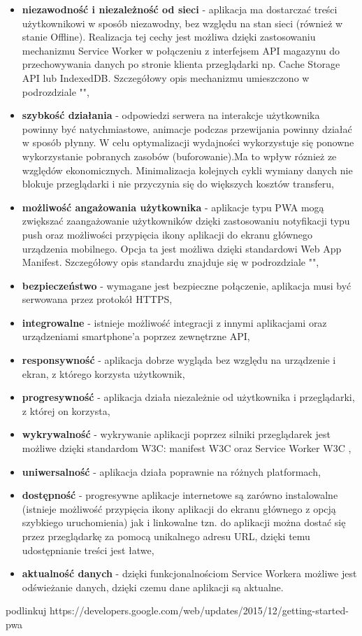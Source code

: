 \documentclass[a4paper,12pt,twoside,openany]{report}
\begin{document}
\begin{itemize}
\item{\textbf{niezawodno\'sć i niezależno\'sć od sieci} - aplikacja ma dostarczać tre\'sci użytkownikowi w sposób niezawodny, bez względu na stan sieci (również w stanie Offline). Realizacja tej cechy jest możliwa dzięki zastosowaniu mechanizmu Service Worker w połączeniu z interfejsem API magazynu do przechowywania danych po stronie klienta przeglądarki np. Cache Storage API lub IndexedDB. Szczegółowy opis mechanizmu umieszczono w podrozdziale "",}
\item{\textbf{szybko\'sć działania} - odpowiedzi serwera na interakcje użytkownika powinny być natychmiastowe, animacje podczas przewijania powinny działać w sposób płynny. W celu optymalizacji wydajno\'sci wykorzystuje się ponowne wykorzystanie pobranych zasobów (buforowanie).Ma to wpływ róznież ze względów ekonomicznych. Minimalizacja kolejnych cykli wymiany danych nie blokuje przeglądarki i nie przyczynia się do większych kosztów transferu,}
\item{\textbf{możliwo\'sć angażowania użytkownika} - aplikacje typu PWA mogą zwiększać zaangażowanie użytkowników dzięki zastosowaniu notyfikacji typu push oraz możliwo\'sci przypięcia ikony aplikacji do ekranu głównego urządzenia mobilnego. Opcja ta jest możliwa dzięki standardowi Web App Manifest. Szczegółowy opis standardu znajduje się w podrozdziale "",}
\item{\textbf{bezpieczeństwo} - wymagane jest bezpieczne połączenie, aplikacja musi być serwowana przez protokół HTTPS,}
\item{\textbf{integrowalne} - istnieje możliwo\'sć integracji z innymi aplikacjami oraz urządzeniami smartphone'a poprzez zewnętrzne API,}
\item{\textbf{responsywno\'sć} - aplikacja dobrze wygląda bez względu na urządzenie i ekran, z którego korzysta użytkownik,}
\item{\textbf{progresywno\'sć} - aplikacja działa niezależnie od użytkownika i przeglądarki, z której on korzysta,}
\item{\textbf{wykrywalno\'sć} - wykrywanie aplikacji poprzez silniki przeglądarek jest możliwe dzięki standardom W3C: manifest W3C \cite{manifest} oraz Service Worker W3C \cite{service},}
\item{\textbf{uniwersalno\'sć} - aplikacja działa poprawnie na różnych platformach,}
\item{\textbf{dostępno\'sć} - progresywne aplikacje internetowe są zarówno instalowalne (istnieje możliwo\'sć przypięcia ikony aplikacji do ekranu głównego z opcją szybkiego uruchomienia) jak i linkowalne tzn. do aplikacji można dostać się przez przeglądarkę za pomocą unikalnego adresu URL, dzięki temu udostępnianie tre\'sci jest łatwe,}
\item{\textbf{aktualno\'sć danych} - dzięki funkcjonalno\'sciom Service Workera możliwe jest od\'swieżanie danych, dzięki czemu dane aplikacji są aktualne.}

\end{itemize}
podlinkuj
https://developers.google.com/web/updates/2015/12/getting-started-pwa
\newpage
\end{document}

